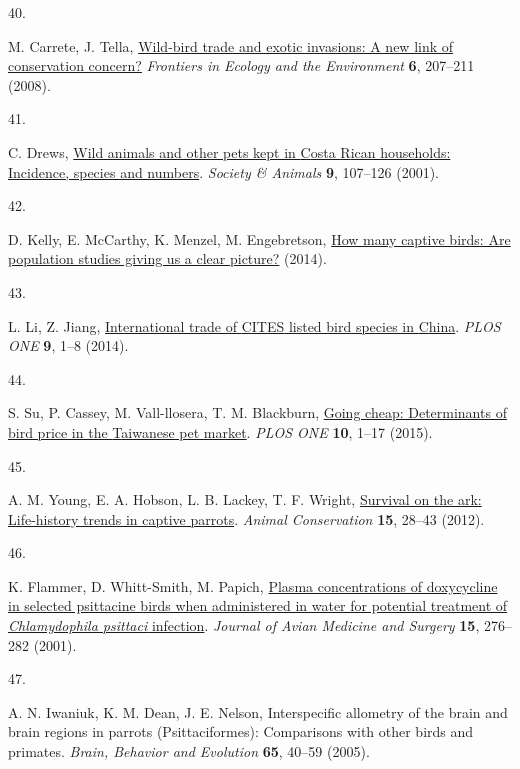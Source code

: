 \documentclass[
  man, donotrepeattitle,floatsintext]{apa6}
\newlength{\cslhangindent}
\newlength{\csllabelwidth}
\newlength{\cslentryspacingunit} %
\newenvironment{CSLReferences}[2] %
 {%
  \setlength{\parindent}{0pt}
  \ifodd #1
  \let\oldpar\par
  \def\par{\hangindent=\cslhangindent\oldpar}
  \fi
  \setlength{\parskip}{#2\cslentryspacingunit}
 }%
 {}
\newcommand{\CSLLeftMargin}[1]{\parbox[t]{\csllabelwidth}{#1}}
\newcommand{\CSLRightInline}[1]{\parbox[t]{\linewidth - \csllabelwidth}{#1}\break}
\begin{document}
\begin{CSLReferences}{0}{0}
\leavevmode{}%
\CSLLeftMargin{40. }%
\CSLRightInline{M. Carrete, J. Tella, \href{https://doi.org/10.1890/070075}{Wild-bird trade and exotic invasions: A new link of conservation concern?} \emph{Frontiers in Ecology and the Environment} \textbf{6}, 207--211 (2008).}

\leavevmode{}%
\CSLLeftMargin{41. }%
\CSLRightInline{C. Drews, \href{https://doi.org/10.1163/156853001753639233}{Wild animals and other pets kept in {C}osta {R}ican households: Incidence, species and numbers}. \emph{Society \& Animals} \textbf{9}, 107--126 (2001).}

\leavevmode{}%
\CSLLeftMargin{42. }%
\CSLRightInline{D. Kelly, E. McCarthy, K. Menzel, M. Engebretson, \href{https://www.avianwelfare.org/issues/overview.htm}{How many captive birds: Are population studies giving us a clear picture?} (2014).}

\leavevmode{}%
\CSLLeftMargin{43. }%
\CSLRightInline{L. Li, Z. Jiang, \href{https://doi.org/10.1371/journal.pone.0085012}{International trade of {CITES} listed bird species in {C}hina}. \emph{PLOS ONE} \textbf{9}, 1--8 (2014).}

\leavevmode{}%
\CSLLeftMargin{44. }%
\CSLRightInline{S. Su, P. Cassey, M. Vall-llosera, T. M. Blackburn, \href{https://doi.org/10.1371/journal.pone.0127482}{Going cheap: Determinants of bird price in the {T}aiwanese pet market}. \emph{PLOS ONE} \textbf{10}, 1--17 (2015).}

\leavevmode{}%
\CSLLeftMargin{45. }%
\CSLRightInline{A. M. Young, E. A. Hobson, L. B. Lackey, T. F. Wright, \href{https://doi.org/10.1111/j.1469-1795.2011.00477.x}{Survival on the ark: Life-history trends in captive parrots}. \emph{Animal Conservation} \textbf{15}, 28--43 (2012).}

\leavevmode{}%
\CSLLeftMargin{46. }%
\CSLRightInline{K. Flammer, D. Whitt-Smith, M. Papich, \href{https://doi.org/10.1647/1082-6742(2001)015\%5B0276:PCODIS\%5D2.0.CO;2}{Plasma concentrations of doxycycline in selected psittacine birds when administered in water for potential treatment of \emph{{C}hlamydophila psittaci} infection}. \emph{Journal of Avian Medicine and Surgery} \textbf{15}, 276--282 (2001).}

\leavevmode{}%
\CSLLeftMargin{47. }%
\CSLRightInline{A. N. Iwaniuk, K. M. Dean, J. E. Nelson, Interspecific allometry of the brain and brain regions in parrots ({P}sittaciformes): Comparisons with other birds and primates. \emph{Brain, Behavior and Evolution} \textbf{65}, 40--59 (2005).}


\end{CSLReferences}
\end{document}
